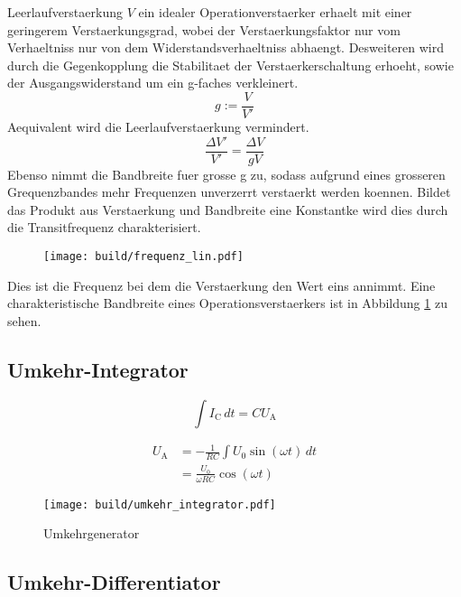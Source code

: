 Leerlaufverstaerkung $V$ ein idealer Operationverstaerker erhaelt mit einer
geringerem Verstaerkungsgrad, wobei der Verstaerkungsfaktor nur vom Verhaeltniss
nur von dem Widerstandsverhaeltniss abhaengt.
Desweiteren wird durch die Gegenkopplung die Stabilitaet der
Verstaerkerschaltung erhoeht, sowie der Ausgangswiderstand um ein g-faches
verkleinert.
\begin{equation}
		g := \frac{V}{V'}
\end{equation}
Aequivalent wird die Leerlaufverstaerkung vermindert.
\begin{equation}
		\frac{\Delta V'}{V'} = \frac{\Delta V}{g V}
\end{equation}
Ebenso nimmt die Bandbreite fuer grosse g zu, sodass aufgrund eines grosseren
Grequenzbandes mehr Frequenzen unverzerrt verstaerkt werden koennen.
Bildet das Produkt aus Verstaerkung und Bandbreite eine Konstantke wird dies
durch die Transitfrequenz charakterisiert.
\begin{figure}[h]
		\centering
		\texttt{[image: build/frequenz\_lin.pdf]}
		\caption{}
		\label{fig:freq}
\end{figure}
Dies ist die Frequenz bei dem die Verstaerkung den Wert eins annimmt.
Eine charakteristische Bandbreite eines Operationsverstaerkers ist in Abbildung
\ref{fig:freq} zu sehen.

\subsection{Umkehr-Integrator}%
\label{sub:umkehr_integrator}

\begin{equation}
		\int I_\text{C} \, dt = C U_\text{A}
\end{equation}

\begin{align}
		U_\text{A} &= - \frac{1}{RC} \int U_\text{0} \sin(\omega t) \, dt \\
				   &= \frac{U_0}{\omega R C} \cos (\omega t)
\end{align}

\begin{figure}[h]
		\centering
		\texttt{[image: build/umkehr\_integrator.pdf]}
		\caption{Umkehrgenerator}
		\label{fig:name}
\end{figure}

\subsection{Umkehr-Differentiator}%
\label{sub:umkehr_differentiator}

